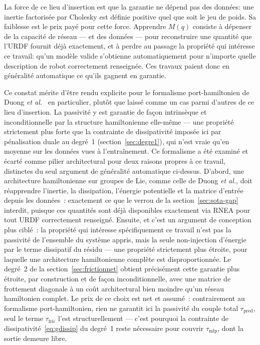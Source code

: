 \documentclass[a4paper, oneside]{article}
\newcommand{\q}{\ensuremath{q}}
\newcommand{\taumlp}{\ensuremath{\tau_{\mathrm{mlp}}}}
\newcommand{\taufric}{\ensuremath{\tau_{\mathrm{fric}}}}
\newcommand{\taupred}{\ensuremath{\tau_{\mathrm{pred}}}}
\begin{document}
La force de ce lieu d'insertion est que la garantie ne dépend pas des données:
une inertie factorisée par Cholesky est définie positive quel que soit le jeu de
poids. Sa faiblesse est le prix payé pour cette force. Apprendre $M(\q)$
consiste à dépenser de la capacité de réseau — et des données — pour
reconstruire une quantité que l'URDF fournit déjà exactement, et à perdre au
passage la propriété qui intéresse ce travail: qu'un modèle valide s'obtienne
automatiquement pour n'importe quelle description de robot correctement
renseignée. Ces travaux paient donc en généralité automatique ce qu'ils gagnent
en garantie.

Ce constat mérite d'être rendu explicite pour le formalisme port-hamiltonien de
Duong \emph{et al.}~\cite{duong2024} en particulier, plutôt que laissé comme un
cas parmi d'autres de ce lieu d'insertion. La passivité y est garantie de
façon intrinsèque et inconditionnelle par la structure hamiltonienne elle-même
— une propriété strictement plus forte que la contrainte de dissipativité
imposée ici par pénalisation duale au degré~1 (section~\ref{sec:degre1}), qui
n'est vraie qu'en moyenne sur les données vues à l'entraînement. Ce formalisme
a été examiné et écarté comme pilier architectural pour deux raisons propres à
ce travail, distinctes du seul argument de généralité automatique ci-dessus.
D'abord, une architecture hamiltonienne sur groupes de Lie, comme celle de
Duong \emph{et al.}, doit réapprendre l'inertie, la dissipation, l'énergie
potentielle et la matrice d'entrée depuis les données~: exactement ce que le
verrou de la section~\ref{sec:sota-gap} interdit, puisque ces quantités sont
déjà disponibles exactement via RNEA pour tout URDF correctement renseigné.
Ensuite, et c'est un argument de conception plus ciblé~: la propriété qui
intéresse spécifiquement ce travail n'est pas la passivité de l'ensemble du
système appris, mais la seule non-injection d'énergie par le terme dissipatif
du résidu — une propriété strictement plus étroite, pour laquelle une
architecture hamiltonienne complète est disproportionnée. Le degré~2 de la
section~\ref{sec:frictionnet} obtient précisément cette garantie plus étroite,
par construction et de façon inconditionnelle, avec une matrice de frottement
diagonale à un coût architectural bien moindre qu'un réseau hamiltonien
complet. Le prix de ce choix est net et assumé~: contrairement au formalisme
port-hamiltonien, rien ne garantit ici la passivité du couple total
$\taupred$, seul le terme $\taufric$ l'est structurellement — c'est pourquoi la
contrainte de dissipativité~\eqref{eq:gdissip} du degré~1 reste nécessaire pour
couvrir $\taumlp$, dont la sortie demeure libre.
\end{document}

